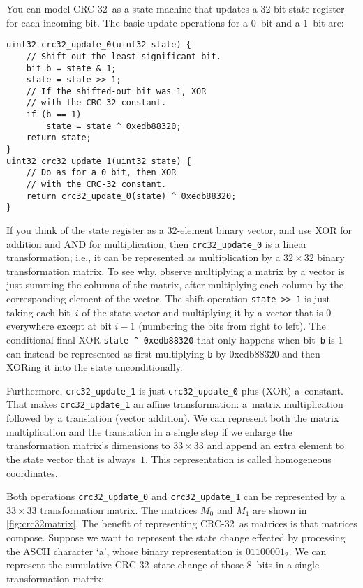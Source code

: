 \documentclass[letterpaper,twocolumn,10pt]{article}
\newcommand{\CRC}{\mbox{CRC-32}}
\begin{document}
You can model \CRC\ as a state machine that updates a 32-bit state register
for each incoming bit.
The basic update operations for a $0$~bit and a $1$~bit are:
{
\small
\begin{verbatim}
uint32 crc32_update_0(uint32 state) {
    // Shift out the least significant bit.
    bit b = state & 1;
    state = state >> 1;
    // If the shifted-out bit was 1, XOR
    // with the CRC-32 constant.
    if (b == 1)
        state = state ^ 0xedb88320;
    return state;
}
uint32 crc32_update_1(uint32 state) {
    // Do as for a 0 bit, then XOR
    // with the CRC-32 constant.
    return crc32_update_0(state) ^ 0xedb88320;
}
\end{verbatim}
}

If you think of the state register as a 32-element binary vector,
and use XOR for addition and AND for multiplication, then
\texttt{crc32\_update\_0} is a linear transformation;
i.e., it can be represented as multiplication by a
$32\times32$ binary transformation matrix.
To see why, observe multiplying a matrix by a vector
is just summing the columns of the matrix,
after multiplying each column by the corresponding element of the vector.
The shift operation \texttt{state~>{}>~1}
is just taking each bit~$i$ of the state vector
and multiplying it by a vector that is $0$ everywhere except at bit $i-1$
(numbering the bits from right to left).
The conditional final XOR \texttt{state~\^~0xedb88320}
that only happens when bit~\texttt{b} is $1$
can instead be represented as first multiplying
\texttt{b} by 0xedb88320
and then XORing it into the state unconditionally.

Furthermore, \texttt{crc32\_update\_1} is just
\texttt{crc32\_update\_0} plus (XOR) a~constant.
That makes \texttt{crc32\_update\_1} an
affine transformation:
a~matrix multiplication followed by a translation (vector addition).
We can represent both the matrix multiplication and the translation
in a single step
if we enlarge the transformation matrix's dimensions to $33\times33$
and append an extra element to the state vector that is always~$1$.
This representation is called
homogeneous coordinates.

Both operations \texttt{crc32\_update\_0} and \texttt{crc32\_update\_1}
can be represented by a $33\times 33$ transformation matrix.
The matrices $M_0$ and $M_1$ are shown in \autoref{fig:crc32matrix}.
The benefit of representing \CRC\ as matrices is that matrices compose.
Suppose we want to represent the state change effected by processing
the ASCII character `a', whose binary representation is
$01100001_2$.
We can represent the cumulative \CRC\ state change of those 8~bits
in a single transformation matrix:
\end{document}
